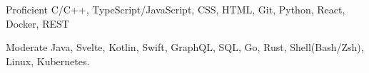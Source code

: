

\begin{cvskills}

  \cvskill
    {Proficient} %
    {C/C++, TypeScript/JavaScript, CSS, HTML, Git, Python, React,}
    {Docker, REST} %

  \cvskill
    {Moderate} %
    {Java, Svelte, Kotlin, Swift, GraphQL, SQL, Go, Rust,}
    {Shell(Bash/Zsh), Linux, Kubernetes.} %

\end{cvskills}
